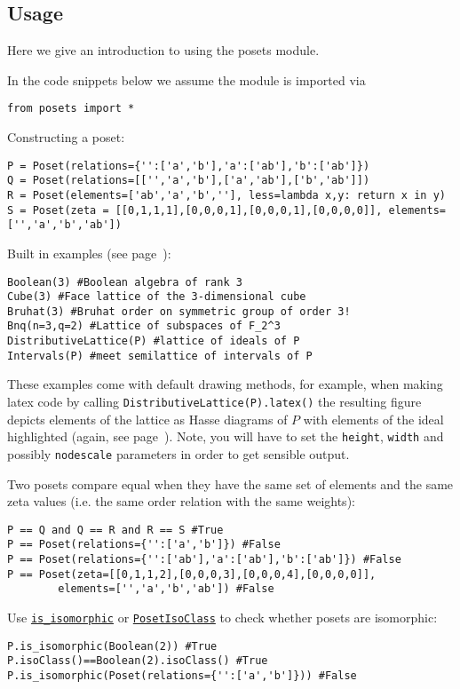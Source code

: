 \documentclass[12pt]{article}
\begin{document}
{{\subsection{Usage}

Here we give an introduction to using the posets module.

In the code snippets below we assume the module is imported via

\verb|from posets import *|

Constructing a poset:
\begin{verbatim}P = Poset(relations={'':['a','b'],'a':['ab'],'b':['ab']})
Q = Poset(relations=[['','a','b'],['a','ab'],['b','ab']])
R = Poset(elements=['ab','a','b',''], less=lambda x,y: return x in y)
S = Poset(zeta = [[0,1,1,1],[0,0,0,1],[0,0,0,1],[0,0,0,0]], elements=['','a','b','ab'])
\end{verbatim}

Built in examples (see page~\pageref{Built in posets}):
\begin{verbatim}
Boolean(3) #Boolean algebra of rank 3
Cube(3) #Face lattice of the 3-dimensional cube
Bruhat(3) #Bruhat order on symmetric group of order 3!
Bnq(n=3,q=2) #Lattice of subspaces of F_2^3
DistributiveLattice(P) #lattice of ideals of P
Intervals(P) #meet semilattice of intervals of P
\end{verbatim}
These examples come with default drawing methods, for example,
when making latex code by calling \verb|DistributiveLattice(P).latex()|
the resulting figure depicts elements of the lattice as
Hasse diagrams of $P$ with elements of the ideal highlighted
(again, see page~\pageref{Built in posets}). Note, you will have
to set the \verb|height|, \verb|width| and possibly \verb|nodescale|
parameters in order to get sensible output.


Two posets compare equal when they have the same
set of elements and the same zeta values (i.e. the same order relation with the same weights):
\begin{verbatim}P == Q and Q == R and R == S #True
P == Poset(relations={'':['a','b']}) #False
P == Poset(relations={'':['ab'],'a':['ab'],'b':['ab']}) #False
P == Poset(zeta=[[0,1,1,2],[0,0,0,3],[0,0,0,4],[0,0,0,0]],
        elements=['','a','b','ab']) #False
\end{verbatim}

Use \hyperlink{Poset.is_isomorphic}{\texttt{is\_isomorphic}} or \hyperlink{PosetIsoClass}{\texttt{PosetIsoClass}} to check whether
posets are isomorphic:
\begin{verbatim}P.is_isomorphic(Boolean(2)) #True
P.isoClass()==Boolean(2).isoClass() #True
P.is_isomorphic(Poset(relations={'':['a','b']})) #False
\end{verbatim}

}}
\end{document}
